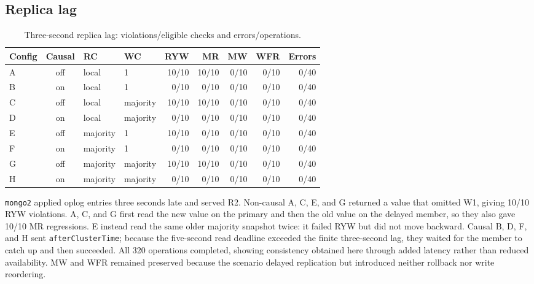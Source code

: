 \documentclass[11pt,a4paper]{article}
\begin{document}
\subsection{Replica lag}
\begin{table}[H]
\centering\scriptsize
\caption{Three-second replica lag: violations/eligible checks and errors/operations.}
\begin{tabular}{@{}lcllrrrrr@{}}
\toprule Config & Causal & RC & WC & RYW & MR & MW & WFR & Errors\\ \midrule
A & off & local & 1 & 10/10 & 10/10 & 0/10 & 0/10 & 0/40\\
B & on  & local & 1 & 0/10 & 0/10 & 0/10 & 0/10 & 0/40\\
C & off & local & majority & 10/10 & 10/10 & 0/10 & 0/10 & 0/40\\
D & on  & local & majority & 0/10 & 0/10 & 0/10 & 0/10 & 0/40\\
E & off & majority & 1 & 10/10 & 0/10 & 0/10 & 0/10 & 0/40\\
F & on  & majority & 1 & 0/10 & 0/10 & 0/10 & 0/10 & 0/40\\
G & off & majority & majority & 10/10 & 10/10 & 0/10 & 0/10 & 0/40\\
H & on  & majority & majority & 0/10 & 0/10 & 0/10 & 0/10 & 0/40\\ \bottomrule
\end{tabular}
\end{table}

\texttt{mongo2} applied oplog entries three seconds late and served R2. Non-causal A, C, E,
and G returned a value that omitted W1, giving 10/10 RYW violations. A, C, and G first read
the new value on the primary and then the old value on the delayed member, so they also gave
10/10 MR regressions. E instead read the same older majority snapshot twice: it failed RYW
but did not move backward. Causal B, D, F, and H sent \texttt{afterClusterTime}; because the
five-second read deadline exceeded the finite three-second lag, they waited for the member to
catch up and then succeeded. All 320 operations completed, showing consistency obtained here
through added latency rather than reduced availability. MW and WFR remained preserved because
the scenario delayed replication but introduced neither rollback nor write reordering.
\FloatBarrier
\end{document}
